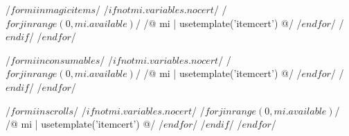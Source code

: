 \documentclass[10pt, landscape, twocolumn]{article}
\begin{document}
\pagestyle{empty}


/$ for mi in magicitems $/
/$if not mi.variables.nocert$/
/$ for j in range(0,mi.available) $/
/@ mi | usetemplate('itemcert') @/
/$endfor$/
/$endif$/
/$endfor$/

/$ for mi in consumables $/
/$if not mi.variables.nocert$/
/$ for j in range(0,mi.available) $/
/@ mi | usetemplate('itemcert') @/
/$ endfor $/
/$endif$/
/$endfor$/

/$ for mi in scrolls $/
/$if not mi.variables.nocert$/
/$ for j in range(0,mi.available) $/
/@ mi | usetemplate('itemcert') @/
/$ endfor $/
/$endif$/
/$endfor$/
\end{document}
